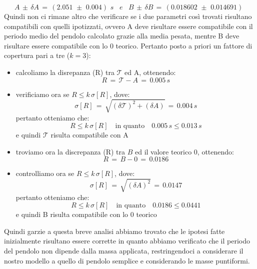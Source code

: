 	\begin{equation*}
		A \,\pm\, \delta A \,=\, (2.051 \,\, \pm \,\, 0.004) \,\,s \,\,\,\,\, e \,\,\,\,\,
		B \,\pm\, \delta B \,=\, (0.018602 \,\, \pm \,\, 0.014691) \,\,
	\end{equation*}
Quindi non ci rimane altro che verificare se i due parametri così trovati risultano compatibili con quelli ipotizzati, ovvero A deve risultare essere compatibile con il periodo medio del pendolo calcolato grazie alla media pesata, mentre B deve risultare essere compatibile con lo 0 teorico. Pertanto posto a priori un fattore di copertura pari a tre ($k = 3$):

\begin{itemize}
	\item{calcoliamo la disrepanza (R) tra $\mathcal{T}$ ed A, ottenendo:
			\begin{equation*}
				R \,=\, \mathcal{T} - A \,=\, 0.005 \,s
			\end{equation*}
			}
	\item{verificiamo ora se $R \leq k\,\sigma[R]$, dove:
			\begin{equation*}
				\sigma[R] \,=\, \sqrt{(\delta \mathcal{T})^2 + (\delta A)} \,=\, 0.004 \, s
			\end{equation*}
			pertanto otteniamo che:
			\begin{equation*}
				R \leq k\,\sigma[R] \quad \text{in quanto} \quad 0.005 \, s \leq 0.013 \, s
			\end{equation*}
			e quindi $\mathcal{T}$ risulta compatibile con A}
	\item{troviamo ora la discrepanza (R) tra $B$ ed il valore teorico 0, ottenendo:
			\begin{equation*}
				R \,=\, B - 0 \,=\, 0.0186
			\end{equation*}
			}
	\item{controlliamo ora se $R \leq k\,\sigma[R]$, dove:
			\begin{equation*}
				\sigma[R] \,=\, \sqrt{(\delta A)^2} \,=\, 0.0147	
			\end{equation*}
			pertanto otteniamo che:
			\begin{equation*}
				R \leq k\,\sigma[R] \quad \text{in quanto} \quad 0.0186 \leq 0.0441
			\end{equation*}
			e quindi B risulta compatibile con lo 0 teorico}			
\end{itemize}
Quindi garzie a questa breve analisi abbiamo trovato che le ipotesi fatte inizialmente risultano essere corrette in quanto abbiamo verificato che il periodo del pendolo non dipende dalla massa applicata, restringendoci a considerare il nostro modello a quello di pendolo semplice e considerando le masse puntiformi.

